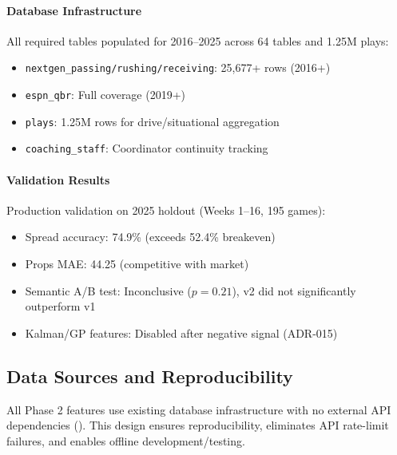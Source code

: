 \paragraph{Database Infrastructure}
All required tables populated for 2016--2025 across 64 tables and 1.25M plays:
\begin{itemize}
  \item \texttt{nextgen\_passing/rushing/receiving}: 25,677+ rows (2016+)
  \item \texttt{espn\_qbr}: Full coverage (2019+)
  \item \texttt{plays}: 1.25M rows for drive/situational aggregation
  \item \texttt{coaching\_staff}: Coordinator continuity tracking
\end{itemize}

\paragraph{Validation Results}
Production validation on 2025 holdout (Weeks 1--16, 195 games):
\begin{itemize}
  \item Spread accuracy: 74.9\% (exceeds 52.4\% breakeven)
  \item Props MAE: 44.25 (competitive with market)
  \item Semantic A/B test: Inconclusive ($p = 0.21$), v2 did not significantly outperform v1
  \item Kalman/GP features: Disabled after negative signal (ADR-015)
\end{itemize}

\subsection{Data Sources and Reproducibility}
\label{subsec:phase2-data-sources}

All Phase 2 features use existing database infrastructure with no external API dependencies (). This design ensures reproducibility, eliminates API rate-limit failures, and enables offline development/testing.

